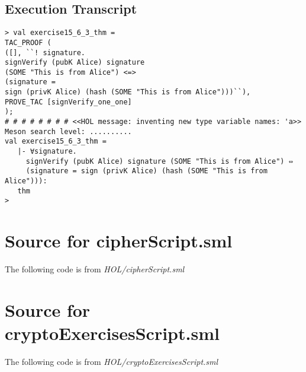 \documentclass[11pt, twoside]{article}
\begin{document}

\subsection{Execution Transcript}
\label{sec:execution-transcript-3}

\lstset{frameround=fftt}
\begin{lstlisting}
> val exercise15_6_3_thm =
TAC_PROOF (
([], ``! signature.
signVerify (pubK Alice) signature
(SOME "This is from Alice") <=>
(signature =
sign (privK Alice) (hash (SOME "This is from Alice")))``),
PROVE_TAC [signVerify_one_one]
);
# # # # # # # # <<HOL message: inventing new type variable names: 'a>>
Meson search level: ..........
val exercise15_6_3_thm =
   |- ∀signature.
     signVerify (pubK Alice) signature (SOME "This is from Alice") ⇔
     (signature = sign (privK Alice) (hash (SOME "This is from Alice"))):
   thm
> 
\end{lstlisting}
\HOLindex

\appendix{}

\section{Source for cipherScript.sml}
\label{sec:source-ciph}

The following code is from \emph{HOL/cipherScript.sml}


\section{Source for cryptoExercisesScript.sml}
\label{sec:source-crypt}

The following code is from \emph{HOL/cryptoExercisesScript.sml}

\end{document}
